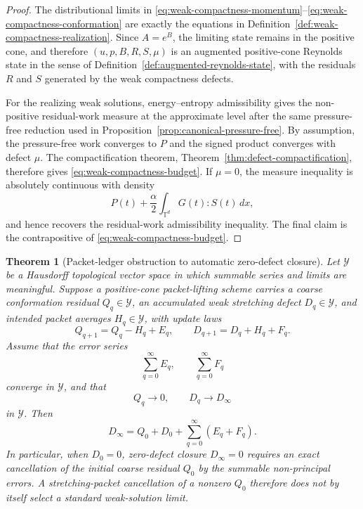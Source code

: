 \documentclass[11pt]{article}
\numberwithin{equation}{section}
\newtheorem{theorem}{Theorem}[section]
\newcommand{\T}{\mathbb T}
\begin{document}
\begin{proof}
The distributional limits in
\eqref{eq:weak-compactness-momentum}--\eqref{eq:weak-compactness-conformation}
are exactly the equations in Definition~\ref{def:weak-compactness-realization}.
Since \(A=e^B\), the limiting state remains in the positive cone, and therefore
\((u,p,B,R,S,\mu)\) is an augmented positive-cone Reynolds state in the sense of
Definition~\ref{def:augmented-reynolds-state}, with the residuals \(R\) and
\(S\) generated by the weak compactness defects.

For the realizing weak solutions, energy--entropy admissibility gives the
non-positive residual-work measure at the approximate level after the same
pressure-free reduction used in Proposition~\ref{prop:canonical-pressure-free}.
By assumption, the pressure-free work converges to \(P\) and the signed product
converges with defect \(\mu\).  The compactification theorem,
Theorem~\ref{thm:defect-compactification}, therefore gives
\eqref{eq:weak-compactness-budget}.  If \(\mu=0\), the measure inequality is
absolutely continuous with density
\[
  P(t)+\frac{\alpha}{2}\int_{\T^d}G(t):S(t)\,dx,
\]
and hence recovers the residual-work admissibility inequality.  The final
claim is the contrapositive of \eqref{eq:weak-compactness-budget}.
\end{proof}

\begin{theorem}[Packet-ledger obstruction to automatic zero-defect closure]
\label{thm:packet-ledger-obstruction}
Let \(\mathcal Y\) be a Hausdorff topological vector space in which summable
series and limits are meaningful.  Suppose a positive-cone packet-lifting
scheme carries a coarse conformation residual \(Q_q\in\mathcal Y\), an
accumulated weak stretching defect \(D_q\in\mathcal Y\), and intended packet
averages \(H_q\in\mathcal Y\), with update laws
\begin{equation}
  Q_{q+1}=Q_q-H_q+E_q,
  \qquad
  D_{q+1}=D_q+H_q+F_q .
  \label{eq:packet-ledger-update}
\end{equation}
Assume that the error series
\[
  \sum_{q=0}^{\infty}E_q,
  \qquad
  \sum_{q=0}^{\infty}F_q
\]
converge in \(\mathcal Y\), and that
\[
  Q_q\to0,\qquad D_q\to D_\infty
\]
in \(\mathcal Y\).  Then
\begin{equation}
  D_\infty
  =
  Q_0+D_0+\sum_{q=0}^{\infty}(E_q+F_q).
  \label{eq:packet-ledger-limit}
\end{equation}
In particular, when \(D_0=0\), zero-defect closure \(D_\infty=0\) requires an
exact cancellation of the initial coarse residual \(Q_0\) by the summable
non-principal errors.  A stretching-packet cancellation of a nonzero \(Q_0\)
therefore does not by itself select a standard weak-solution limit.
\end{theorem}
\end{document}
